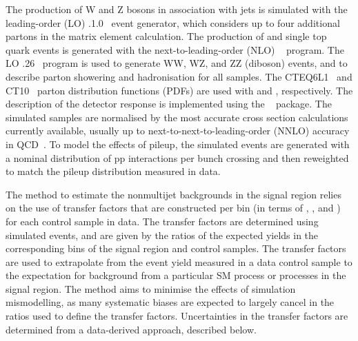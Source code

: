 The production of W and Z bosons in association with jets is simulated
with the leading-order (LO) .1.0~\cite{madgraph5} event
generator, which considers up to four additional partons in the matrix
element calculation. The production of \ttbar and single top quark
events is generated with the next-to-leading-order (NLO) ~\cite{powheg, Nason:2004rx, Alioli:2010xd, Frixione:2007nw}
program. The LO .26~\cite{pythia} program is used to
generate WW, WZ, and ZZ (diboson) events, and to describe parton
showering and hadronisation for all samples. The
{CTEQ6L1}~\cite{Pumplin:2002vw} and {CT10}~\cite{ct10} parton
distribution functions (PDFs) are used with \MADGRAPH and \POWHEG,
respectively. The description of the detector response is implemented
using the \GEANTfour~\cite{geant} package. The simulated samples are
normalised by the most accurate cross section calculations currently
available, usually up to next-to-next-to-leading-order (NNLO) accuracy
in QCD~\cite{xs-1, Gavin:2012sy, xs-2, xs-3, Czakon:2011xx}. To model
the effects of pileup, the simulated events are generated with a
nominal distribution of pp interactions per bunch crossing and then
reweighted to match the pileup distribution measured in data.

The method to estimate the nonmultijet backgrounds in the signal
region relies on the use of transfer factors that are constructed per
bin (in terms of \njet, \nb, and \scalht) for each control sample in
data. The transfer factors are determined using simulated events, and
are given by the ratios of the expected yields in the corresponding
bins of the signal region and control samples. The transfer factors
are used to extrapolate from the event yield measured in a data
control sample to the expectation for background from a particular SM
process or processes in the signal region. The method aims to minimise
the effects of simulation mismodelling, as many systematic biases are
expected to largely cancel in the ratios used to define the transfer
factors. Uncertainties in the transfer factors are determined from a
data-derived approach, described below.

